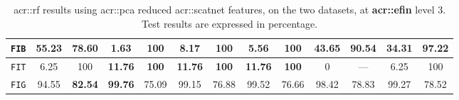 \begin{sidewaystable}[htpb]
\begin{tabular}{| c | c c | c c | c c | c c | c c | c c |}
                    \hline
                    \texttt{FIB} & \textbf{55.23} & 78.60 & 1.63 & \textbf{100} & 8.17 & \textbf{100} & 5.56 & \textbf{100} & 43.65 & 90.54 & 34.31 & 97.22 \\
                    \hline
                    \texttt{FIT} & 6.25 & 100 & \textbf{11.76} & \textbf{100} & \textbf{11.76} & \textbf{100} & \textbf{11.76} & \textbf{100} & 0 & --- & 6.25 & 100 \\
                    \hline
                    \texttt{FIG} & 94.55 & \textbf{82.54} & \textbf{99.76} & 75.09 & 99.15 & 76.88 & 99.52 & 76.66 & 98.42 & 78.83 & 99.27 & 78.52 \\
                    \hline
                \end{tabular}
                \caption{
                    \label{tab::stats_scat_pca_rf_f3}
                    \gls{acr::rf} results using \gls{acr::pca} reduced \gls{acr::scatnet} features, on the two datasets, at \textbf{\gls{acr::efin}} level 3.
                    Test results are expressed in percentage.
                }
            \end{sidewaystable}

